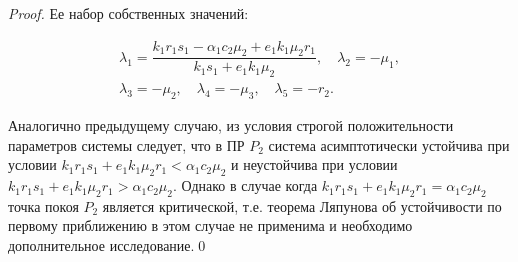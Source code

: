 \documentclass[14pt,a4paper]{extarticle}
\begin{document}
\begin{proof}
		Ее набор собственных значений:
		
		\begin{multline*}
		\lambda_1=\dfrac{k_1r_1s_1 - \alpha_1c_2\mu_2 + e_1k_1\mu_2r_1}{k_1s_1 + e_1k_1\mu_2},\quad \lambda_2=-\mu_1,\\
		\lambda_3=-\mu_2,\quad \lambda_4=-\mu_3,\quad \lambda_5=-r_2.
		\end{multline*}
		
		Аналогично предыдущему случаю, из условия строгой положительности параметров системы следует, что в ПР $P_2$ система асимптотически устойчива при условии $k_1r_1s_1 + e_1k_1\mu_2r_1< \alpha_1c_2\mu_2$ и неустойчива при условии $k_1r_1s_1 + e_1k_1\mu_2r_1>\alpha_1c_2\mu_2$. Однако в случае когда $k_1r_1s_1 + e_1k_1\mu_2r_1=\alpha_1c_2\mu_2$ точка покоя $P_2$ является критической, т.е. теорема Ляпунова об устойчивости по первому приближению в этом случае не применима и необходимо дополнительное исследование.\qed
	\end{proof}
	
\end{document}
